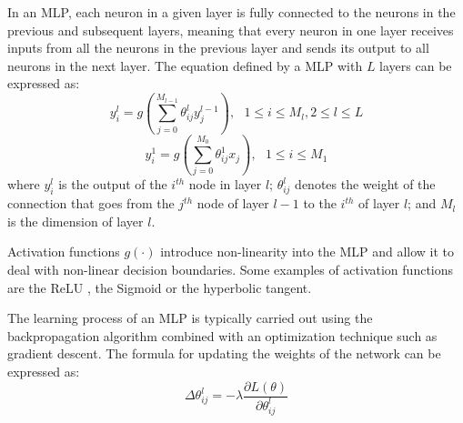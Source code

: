 \documentclass[11pt,english,listoffigures,listoftables]{tfgetsinf}
\begin{document}
In an MLP, each neuron in a given layer is fully connected to the neurons in the previous and subsequent layers, meaning that every neuron in one layer receives inputs from all the neurons in the previous layer and sends its output to all neurons in the next layer. The equation defined by a MLP with $L$ layers can be expressed as:
%
\begin{equation}
    y_i^l = g\left(\sum_{j=0}^{M_{l-1}}\theta_{ij}^l  y_j^{l-1}\right), \text{  }1 \leq i \leq M_l, 2 \leq l \leq L
\end{equation}
%
\begin{equation}
    y_i^1 = g\left(\sum_{j=0}^{M_0} \theta_{ij}^1x_j\right), \text{   } 1 \leq i \leq M_1
\end{equation}
%
where $y_i^l $ is the output of the $i^{th}$ node in layer $l$; $\theta_{ij}^l$ denotes the weight of the connection that goes from the $j^{th}$ node of layer $l-1$ to the $i^{th}$ of layer $l$; and $M_l$ is the dimension of layer $l$.

Activation functions \( g(\cdot)\) introduce non-linearity into the MLP and allow it to deal with non-linear decision boundaries. Some examples of activation functions are the ReLU \cite{agarap2018relu}, the Sigmoid or the hyperbolic tangent.

The learning process of an MLP is typically carried out using the backpropagation algorithm combined with an optimization technique such as gradient descent. The formula for updating the weights of the network can be expressed as:
%
\begin{equation}
    \Delta \theta_{ij}^l=-\lambda \frac{\partial L(\theta)}{\partial \theta_{ij}^l}
\end{equation}




\end{document}
